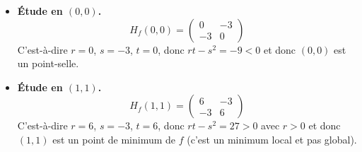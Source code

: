 \begin{exemple}{}{}
\begin{itemize}
	\item \textbf{Étude en $(0,0)$.}     
    $$H_f(0,0) = \begin{pmatrix}0&-3\\-3&0\end{pmatrix}$$
    C'est-à-dire $r=0$, $s=-3$, $t=0$, donc $rt-s^2 = -9 < 0$ et donc $(0,0)$ est un point-selle.
   
	
    \item \textbf{Étude en $(1,1)$.}	
    $$H_f(1,1) = \begin{pmatrix}6&-3\\-3&6\end{pmatrix}$$
    C'est-à-dire $r=6$, $s=-3$, $t=6$, donc $rt-s^2 = 27 > 0$ avec $r>0$ et donc $(1,1)$ est un point de minimum de $f$ (c'est un minimum local et pas global).	
\end{itemize}

\end{exemple}

\bigskip	

